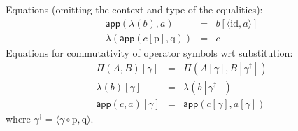 \documentclass[submission,copyright,creativecommons]{eptcs}
\newcommand{\ERASER}[1]{}
\newcommand{\id}{\mathsf{id}}
\newcommand{\app}[2]{{#1\,#2}} %
\def\id{\mathrm{id}}
\def\lctx{\mathrm{lctx}}
\newcommand{\ctx}{\mathrm{ctx}}
\newcommand{\ty}{\mathrm{ty}}
\newcommand{\tm}{\mathrm{tm}}
\newcommand{\tuple}[1]{\langle #1 \rangle}
\def\p{\mathrm{p}}
\def\q{\mathrm{q}}
\def\app{\mathsf{app}}
\def\Sigmaint{{\Sigma^\mathrm{up}}}
\begin{document}
\ERASER{MB: check. Perhaps better to describe how to modify \ref{sec:gatPiU}:
prefix every rule with $n:\lctx$ and add index $n$ to every occurrence
of $\ctx,\ty,\tm$. PD: we didn't spell all of this out in  \ref{sec:gatPiU}. This is here, since we want to have a complete definition of $\Sigmaint$.}
Equations (omitting the context and type of the equalities):
 \begin{eqnarray*}
 \app(\lambda(b),a) &=& b[\tuple{\id,a}]\\
 \lambda(\app(c[\p],\q)) &=& c
 \end{eqnarray*}
 Equations for commutativity of operator symbols wrt substitution:
 \begin{eqnarray*}
\Pi(A,B)[ \gamma ] &=& \Pi(A [ \gamma ], B[ \gamma^\dagger ])\\
\lambda(b) [ \gamma ] &=& \lambda(b[\gamma^\dagger ])\\
\app(c,a) [ \gamma ] &=& \app(c[ \gamma ], a[ \gamma ] )
\end{eqnarray*}
where $\gamma^\dagger = \tuple{\gamma \circ \p, \q}$.
\end{document}
